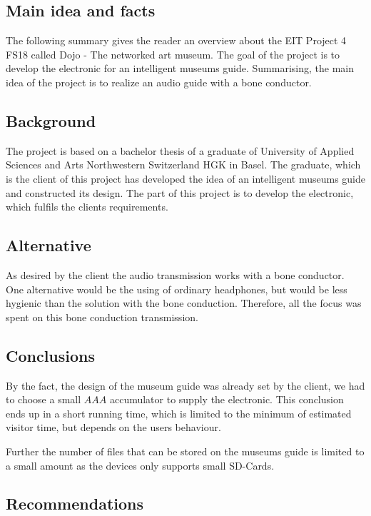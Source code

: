 \subsection*{Main idea and facts}

The following summary gives the reader an overview about the EIT Project 4 FS18 called Dojo - The networked art museum. The goal of the project is to develop the electronic for an intelligent museums guide. Summarising, the main idea of the project is to realize an audio guide with a bone conductor.

\subsection*{Background}

The project is based on a bachelor thesis of a graduate of University of Applied Sciences and Arts Northwestern Switzerland HGK in Basel. The graduate, which is the client of this project has developed the idea of an intelligent museums guide and constructed its design. The part of this project is to develop the electronic, which fulfils the clients requirements.

\subsection*{Alternative}

As desired by the client the audio transmission works with a bone conductor. One alternative would be the using of ordinary headphones, but would be less hygienic than the solution with the bone conduction. Therefore, all the focus was spent on this bone conduction transmission.

\subsection*{Conclusions}

By the fact, the design of the museum guide was already set by the client, we had to choose a small $AAA$ accumulator to supply the electronic. This conclusion ends up in a short running time, which is limited to the minimum of estimated visitor time, but depends on the users behaviour.

Further the number of files that can be stored on the museums guide is limited to a small amount as the devices only supports small SD-Cards.

\subsection*{Recommendations}

